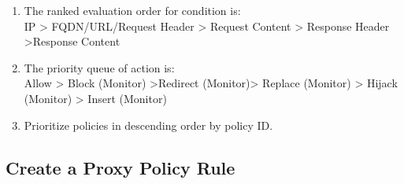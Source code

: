 \begin{description}[leftmargin=0pt]
    \item
    \begin{enumerate}
        \setlength{\topsep}{0pt} %
        \item The ranked evaluation order for condition is:\\
        IP > FQDN/URL/Request Header > Request Content > Response Header >Response Content
        \item The priority queue of action is:\\
        Allow > Block (Monitor) >Redirect (Monitor)> Replace (Monitor) > Hijack (Monitor) > Insert (Monitor) 
        \item Prioritize policies in descending order by policy ID.
    \end{enumerate}
\end{description}

\subsection*{\hypertarget{link:Create a Proxy Policy Rule}{Create a Proxy Policy Rule}}
\label{sec:policies:proxy:create}

